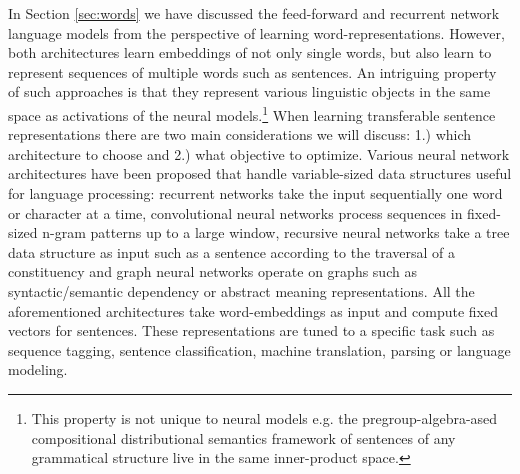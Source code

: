 In Section \ref{sec:words} we have discussed the feed-forward \citep{bengio2003neural}
and recurrent network \citep{mikolov2010recurrent} language models from the perspective
of learning word-representations. However, both architectures learn embeddings of not only single words,
but also learn to represent sequences of multiple words such as sentences.
An intriguing property of such approaches is that
they represent various linguistic objects in the same space as activations of the neural models.\footnote{This property is not unique to neural models e.g. the pregroup-algebra-ased compositional distributional
semantics framework of \cite{coecke2010mathematical}
sentences of any grammatical structure live in the same inner-product space.}
When learning transferable
sentence representations there are two main considerations we will discuss:
1.) which architecture to choose and 2.) what objective to optimize.
Various neural network architectures have been proposed that
handle variable-sized data structures useful for language processing: recurrent networks
take the input sequentially one word or character at a time,
convolutional neural networks
\citep{kalchbrenner2014convolutional,zhang2015character,conneau2016very,chen2013learning}
process sequences in fixed-sized n-gram patterns up to a large window,
recursive neural networks \citep{goller1996learning,socher2011parsing,kai2015treelstm}
take a tree data structure as input such as a sentence according to the traversal of a
constituency and graph neural networks operate on graphs \citep{marcheggiani2017encoding} such as
syntactic/semantic dependency or abstract meaning representations.
All the aforementioned architectures take word-embeddings as input
and compute fixed vectors for sentences.
These representations are tuned to a specific task such as sequence tagging,
sentence classification, machine translation, parsing or language modeling.


